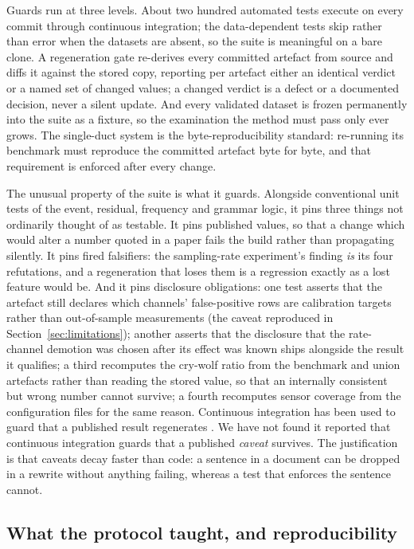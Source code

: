 \documentclass[11pt,letterpaper]{article}
\begin{document}
Guards run at three levels. About two hundred automated tests execute on every commit through continuous integration; the data-dependent tests skip rather than error when the datasets are absent, so the suite is meaningful on a bare clone. A regeneration gate re-derives every committed artefact from source and diffs it against the stored copy, reporting per artefact either an identical verdict or a named set of changed values; a changed verdict is a defect or a documented decision, never a silent update. And every validated dataset is frozen permanently into the suite as a fixture, so the examination the method must pass only ever grows. The single-duct system is the byte-reproducibility standard: re-running its benchmark must reproduce the committed artefact byte for byte, and that requirement is enforced after every change.

The unusual property of the suite is what it guards. Alongside conventional unit tests of the event, residual, frequency and grammar logic, it pins three things not ordinarily thought of as testable. It pins published values, so that a change which would alter a number quoted in a paper fails the build rather than propagating silently. It pins fired falsifiers: the sampling-rate experiment's finding \emph{is} its four refutations, and a regeneration that loses them is a regression exactly as a lost feature would be. And it pins disclosure obligations: one test asserts that the artefact still declares which channels' false-positive rows are calibration targets rather than out-of-sample measurements (the caveat reproduced in Section~\ref{sec:limitations}); another asserts that the disclosure that the rate-channel demotion was chosen after its effect was known ships alongside the result it qualifies; a third recomputes the cry-wolf ratio from the benchmark and union artefacts rather than reading the stored value, so that an internally consistent but wrong number cannot survive; a fourth recomputes sensor coverage from the configuration files for the same reason. Continuous integration has been used to guard that a published result regenerates \cite{jimenez2017popper}. We have not found it reported that continuous integration guards that a published \emph{caveat} survives. The justification is that caveats decay faster than code: a sentence in a document can be dropped in a rewrite without anything failing, whereas a test that enforces the sentence cannot.

\subsection{What the protocol taught, and reproducibility}
\end{document}
